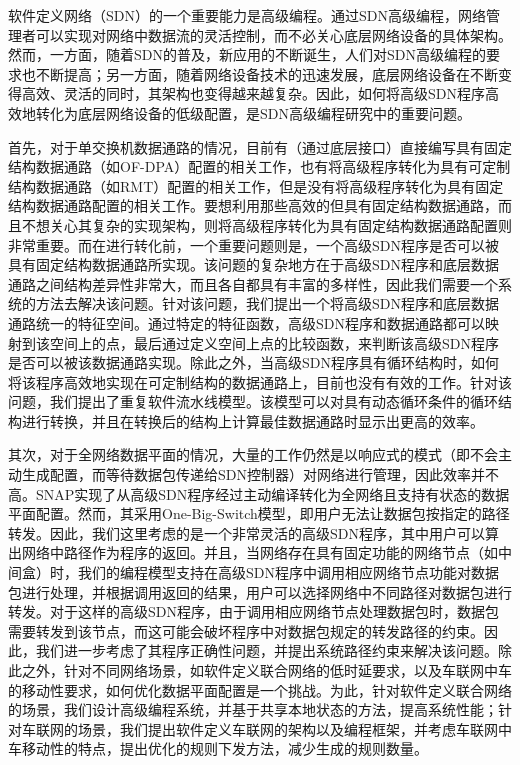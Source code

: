 \begin{cabstract}  

软件定义网络（SDN）的一个重要能力是高级编程。通过SDN高级编程，网络管理者可以实现对网络中数据流的灵活控制，而不必关心底层网络设备的具体架构。然而，一方面，随着SDN的普及，新应用的不断诞生，人们对SDN高级编程的要求也不断提高；另一方面，随着网络设备技术的迅速发展，底层网络设备在不断变得高效、灵活的同时，其架构也变得越来越复杂。因此，如何将高级SDN程序高效地转化为底层网络设备的低级配置，是SDN高级编程研究中的重要问题。

首先，对于单交换机数据通路的情况，目前有（通过底层接口）直接编写具有固定结构数据通路（如OF-DPA）配置的相关工作，也有将高级程序转化为具有可定制结构数据通路（如RMT）配置的相关工作，但是没有将高级程序转化为具有固定结构数据通路配置的相关工作。要想利用那些高效的但具有固定结构数据通路，而且不想关心其复杂的实现架构，则将高级程序转化为具有固定结构数据通路配置则非常重要。而在进行转化前，一个重要问题则是，一个高级SDN程序是否可以被具有固定结构数据通路所实现。该问题的复杂地方在于高级SDN程序和底层数据通路之间结构差异性非常大，而且各自都具有丰富的多样性，因此我们需要一个系统的方法去解决该问题。针对该问题，我们提出一个将高级SDN程序和底层数据通路统一的特征空间。通过特定的特征函数，高级SDN程序和数据通路都可以映射到该空间上的点，最后通过定义空间上点的比较函数，来判断该高级SDN程序是否可以被该数据通路实现。除此之外，当高级SDN程序具有循环结构时，如何将该程序高效地实现在可定制结构的数据通路上，目前也没有有效的工作。针对该问题，我们提出了重复软件流水线模型。该模型可以对具有动态循环条件的循环结构进行转换，并且在转换后的结构上计算最佳数据通路时显示出更高的效率。

其次，对于全网络数据平面的情况，大量的工作仍然是以响应式的模式（即不会主动生成配置，而等待数据包传递给SDN控制器）对网络进行管理，因此效率并不高。SNAP实现了从高级SDN程序经过主动编译转化为全网络且支持有状态的数据平面配置。然而，其采用One-Big-Switch模型，即用户无法让数据包按指定的路径转发。因此，我们这里考虑的是一个非常灵活的高级SDN程序，其中用户可以算出网络中路径作为程序的返回。并且，当网络存在具有固定功能的网络节点（如中间盒）时，我们的编程模型支持在高级SDN程序中调用相应网络节点功能对数据包进行处理，并根据调用返回的结果，用户可以选择网络中不同路径对数据包进行转发。对于这样的高级SDN程序，由于调用相应网络节点处理数据包时，数据包需要转发到该节点，而这可能会破坏程序中对数据包规定的转发路径的约束。因此，我们进一步考虑了其程序正确性问题，并提出系统路径约束来解决该问题。除此之外，针对不同网络场景，如软件定义联合网络的低时延要求，以及车联网中车的移动性要求，如何优化数据平面配置是一个挑战。为此，针对软件定义联合网络的场景，我们设计高级编程系统，并基于共享本地状态的方法，提高系统性能；针对车联网的场景，我们提出软件定义车联网的架构以及编程框架，并考虑车联网中车移动性的特点，提出优化的规则下发方法，减少生成的规则数量。

\end{cabstract}

